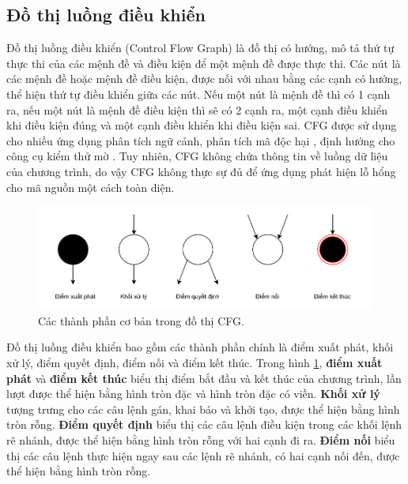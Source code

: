 \subsection{Đồ thị luồng điều khiển}

Đồ thị luồng điều khiển (Control Flow Graph) \cite{yan2019classifying} là đồ thị có hướng, mô tả thứ tự thực thi của các mệnh đề và điều kiện để một mệnh đề được thực thi.
Các nút là các mệnh đề hoặc mệnh đề điều kiện, được nối với nhau bằng các cạnh có hướng, thể hiện thứ tự điều khiển giữa các nút.
Nếu một nút là mệnh đề thì có 1 cạnh ra, nếu một nút là mệnh đề điều kiện thì sẽ có 2 cạnh ra, một cạnh điều khiển khi điều kiện đúng và một cạnh điều khiển khi điều kiện sai.
CFG được sử dụng cho nhiều ứng dụng phân tích ngữ cảnh, phân tích mã độc hại \cite{gascon2013structural}, định hướng cho công cụ kiểm thử mờ \cite{sparks2007automated}.
Tuy nhiên, CFG không chứa thông tin về luồng dữ liệu của chương trình, do vậy CFG không thực sự đủ để ứng dụng phát hiện lỗ hổng cho mã nguồn một cách toàn diện.

\begin{figure}[H]
  \includegraphics[width=1\columnwidth]{figures/c2/c2_cfg_point.drawio.pdf}
  \centering
  \caption{Các thành phần cơ bản trong đồ thị CFG.}
  \label{img:c2_cfg_point}
\end{figure}

Đồ thị luồng điều khiển bao gồm các thành phần chính là điểm xuất phát, khối xử lý, điểm quyết định, điểm nối và điểm kết thúc. Trong hình \ref{img:c2_cfg_point}, \textbf{điểm xuất phát} và \textbf{điểm kết thúc} biểu thị điểm bắt đầu và kết thúc của chương trình, lần lượt được thể hiện bằng hình tròn đặc và hình tròn đặc có viền.
\textbf{Khối xử lý} tượng trưng cho các câu lệnh gán, khai báo và khởi tạo, được thể hiện bằng hình tròn rỗng.
\textbf{Điểm quyết định} biểu thị các câu lệnh điều kiện trong các khối lệnh rẽ nhánh, được thể hiện bằng hình tròn rỗng với hai cạnh đi ra.
\textbf{Điểm nối} biểu thị các câu lệnh thực hiện ngay sau các lệnh rẽ nhánh, có hai cạnh nối đến, được thể hiện bằng hình tròn rỗng.

